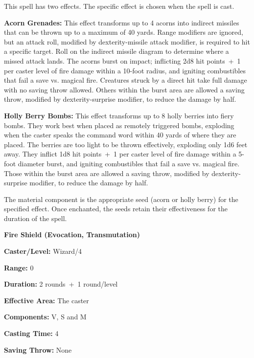 \begin{multicols}{2}
This spell has two effects.  The specific effect is chosen when the spell is cast.

\textbf{Acorn Grenades:} This effect transforms up to 4 acorns into indirect missiles that can be thrown up to a maximum of 40 yards.  Range modifiers are ignored, but an attack roll, modified by dexterity-missile attack modifier, is required to hit a specific target.  Roll on the indirect missile diagram to determine where a missed attack lands.  The acorns burst on impact; inflicting 2d8 hit points~+~1 per caster level of fire damage within a 10-foot radius, and igniting combustibles that fail a save vs. magical fire.  Creatures struck by a direct hit take full damage with no saving throw allowed.  Others within the burst area are allowed a saving throw, modified by dexterity-surprise modifier, to reduce the damage by half. 

\textbf{Holly Berry Bombs:} This effect transforms up to 8 holly berries into fiery bombs.  They work best when placed as remotely triggered bombs, exploding when the caster speaks the command word within 40 yards of where they are placed.  The berries are too light to be thrown effectively, exploding only 1d6 feet away.  They inflict 1d8 hit points~+~1 per caster level of fire damage within a 5-foot diameter burst, and igniting combustibles that fail a save vs. magical fire.  Those within the burst area are allowed a saving throw, modified by dexterity-surprise modifier, to reduce the damage by half. 
 
The material component is the appropriate seed (acorn or holly berry) for the specified effect.  Once enchanted, the seeds retain their effectiveness for the duration of the spell.

\vspace{1em}

\noindent
\begin{minipage}{\columnwidth}

\noindent \textbf{Fire Shield (Evocation, Transmutation)}

\noindent \textbf{Caster/Level:} Wizard/4

\noindent \textbf{Range:} 0

\noindent \textbf{Duration:} 2 rounds~+~1 round/level

\noindent \textbf{Effective Area:} The caster

\noindent \textbf{Components:} V, S and M

\noindent \textbf{Casting Time:} 4

\noindent \textbf{Saving Throw:} None


\end{minipage}
\end{multicols}
